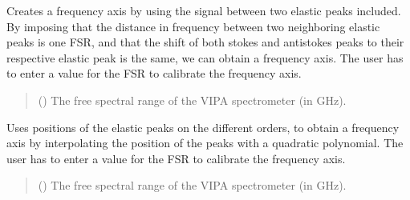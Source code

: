 \documentclass[letterpaper,10pt,english]{sphinxmanual}
\begin{document}
\begin{fulllineitems}
\begin{fulllineitems}
\label{\detokenize{source/_autosummary/HDF5_BLS_analyse.Analyse_VIPA:HDF5_BLS_analyse.Analyse_VIPA.interpolate_between_one_order}}
\pysigstartsignatures
\pysiglinewithargsret
{}
{}
{}
\pysigstopsignatures
\sphinxAtStartPar
Creates a frequency axis by using the signal between two elastic peaks included. By imposing that the distance in frequency between two neighboring elastic peaks is one FSR, and that the shift of both stokes and anti\sphinxhyphen{}stokes peaks to their respective elastic peak is the same, we can obtain a frequency axis. The user has to enter a value for the FSR to calibrate the frequency axis.
\begin{quote}\begin{description}
\sphinxAtStartPar
{} () \textendash{} The free spectral range of the VIPA spectrometer (in GHz).

\end{description}\end{quote}

\end{fulllineitems}


\begin{fulllineitems}
\label{\detokenize{source/_autosummary/HDF5_BLS_analyse.Analyse_VIPA:HDF5_BLS_analyse.Analyse_VIPA.interpolate_elastic}}
\pysigstartsignatures
\pysiglinewithargsret
{}
{}
{}
\pysigstopsignatures
\sphinxAtStartPar
Uses positions of the elastic peaks on the different orders, to obtain a frequency axis by interpolating the position of the peaks with a quadratic polynomial. The user has to enter a value for the FSR to calibrate the frequency axis.
\begin{quote}\begin{description}
\sphinxAtStartPar
{} () \textendash{} The free spectral range of the VIPA spectrometer (in GHz).


\end{description}
\end{quote}
\end{fulllineitems}
\end{fulllineitems}
\end{document}
